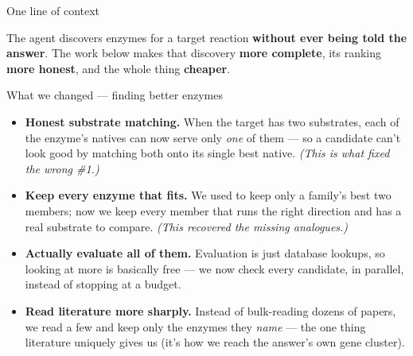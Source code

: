 \documentclass[aspectratio=169,11pt]{beamer}
\newcommand{\hl}[1]{{\color{brand}\textbf{#1}}}
\newcommand{\hlt}[1]{{\color{brand2}\textbf{#1}}}
\newcommand{\hla}[1]{{\color{accent}\textbf{#1}}}
\begin{document}
\begin{frame}{One line of context}
  \vspace{0.5em}
  \begin{center}
  \end{center}
  \vspace{0.6em}
  \begin{center}\small
  The agent discovers enzymes for a target reaction \hla{without ever being told the
  answer}. The work below makes that discovery \hl{more complete}, its ranking
  \hl{more honest}, and the whole thing \hl{cheaper}.
  \end{center}
\end{frame}

\begin{frame}{What we changed — finding better enzymes}
  \begin{itemize}
    \item \hlt{Honest substrate matching.} When the target has two substrates, each of
      the enzyme's natives can now serve only \emph{one} of them — so a candidate can't
      look good by matching both onto its single best native. \emph{(This is what fixed
      the wrong \#1.)}
    \item \hlt{Keep every enzyme that fits.} We used to keep only a family's best two
      members; now we keep every member that runs the right direction and has a real
      substrate to compare. \emph{(This recovered the missing analogues.)}
    \item \hlt{Actually evaluate all of them.} Evaluation is just database lookups, so
      looking at more is basically free — we now check every candidate, in parallel,
      instead of stopping at a budget.
    \item \hlt{Read literature more sharply.} Instead of bulk-reading dozens of papers,
      we read a few and keep only the enzymes they \emph{name} — the one thing
      literature uniquely gives us (it's how we reach the answer's own gene cluster).
  \end{itemize}
\end{frame}
\end{document}
